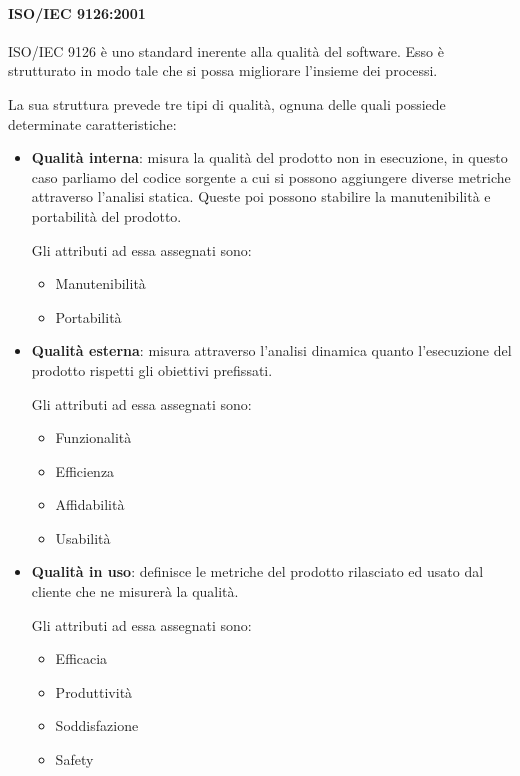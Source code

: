 	\paragraph{ISO/IEC 9126:2001}
	ISO/IEC 9126 è uno standard inerente alla qualità del software. Esso è strutturato in modo tale che si possa migliorare l'insieme dei processi.

	La sua struttura prevede tre tipi di qualità, ognuna delle quali possiede determinate caratteristiche:

	\begin{itemize}
		\item \textbf{Qualità interna}: misura la qualità del prodotto non in esecuzione, in questo caso parliamo del codice sorgente a cui si possono aggiungere diverse metriche attraverso l'analisi statica. Queste poi possono stabilire la manutenibilità e portabilità del prodotto.

		Gli attributi ad essa assegnati sono:

		\begin{itemize}
			\item Manutenibilità
			\item Portabilità
		\end{itemize}

		\item \textbf{Qualità esterna}: misura attraverso l'analisi dinamica quanto l'esecuzione del prodotto rispetti gli obiettivi prefissati.

		Gli attributi ad essa assegnati sono:

			\begin{itemize}
			\item Funzionalità
			\item Efficienza
			\item Affidabilità
			\item Usabilità
		\end{itemize}

		\item \textbf{Qualità in uso}: definisce le metriche del prodotto rilasciato ed usato dal cliente che ne misurerà la qualità.

		Gli attributi ad essa assegnati sono:

		\begin{itemize}
			\item Efficacia
			\item Produttività
			\item Soddisfazione
			\item Safety
		\end{itemize}
	\end{itemize}

